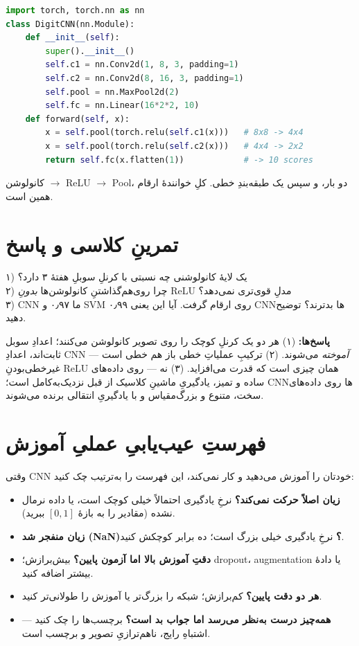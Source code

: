 \documentclass[12pt,a4paper]{article}
\begin{document}
\begin{ltrcode}
\begin{lstlisting}[language=Python]
import torch, torch.nn as nn
class DigitCNN(nn.Module):
    def __init__(self):
        super().__init__()
        self.c1 = nn.Conv2d(1, 8, 3, padding=1)
        self.c2 = nn.Conv2d(8, 16, 3, padding=1)
        self.pool = nn.MaxPool2d(2)
        self.fc = nn.Linear(16*2*2, 10)
    def forward(self, x):
        x = self.pool(torch.relu(self.c1(x)))   # 8x8 -> 4x4
        x = self.pool(torch.relu(self.c2(x)))   # 4x4 -> 2x2
        return self.fc(x.flatten(1))            # -> 10 scores
\end{lstlisting}
\end{ltrcode}

کانولوشن $\rightarrow$ ReLU $\rightarrow$ Pool، دو بار، و سپس یک طبقه‌بندِ خطی. کلِ خوانندهٔ ارقام همین است.

\section{تمرینِ کلاسی و پاسخ}

\begin{tamrin}
۱) یک لایهٔ کانولوشنی چه نسبتی با کرنلِ سوبلِ هفتهٔ ۳ دارد؟\\
۲) چرا روی‌هم‌گذاشتنِ کانولوشن‌ها \emph{بدونِ} ReLU مدلِ قوی‌تری نمی‌دهد؟\\
۳) CNNِ ما ۰٫۹۷ و SVM ۰٫۹۹ روی ارقام گرفت. آیا این یعنی CNNها بدترند؟ توضیح دهید.
\end{tamrin}

\textbf{پاسخ‌ها:} (۱) هر دو یک کرنلِ کوچک را روی تصویر کانولوشن می‌کنند؛ اعدادِ سوبل ثابت‌اند، اعدادِ CNN \emph{آموخته} می‌شوند. (۲) ترکیبِ عملیاتِ خطی باز هم خطی است — غیرخطی‌بودنِ ReLU همان چیزی است که قدرت می‌افزاید. (۳) نه — روی داده‌های ساده و تمیز، یادگیریِ ماشینِ کلاسیک از قبل نزدیک‌به‌کامل است؛ CNNها روی داده‌های سخت، متنوع و بزرگ‌مقیاس و با یادگیریِ انتقالی برنده می‌شوند.

\section{فهرستِ عیب‌یابیِ عملیِ آموزش}

وقتی CNNِ خودتان را آموزش می‌دهید و کار نمی‌کند، این فهرست را به‌ترتیب چک کنید:

\begin{itemize}
  \item \textbf{زیان اصلاً حرکت نمی‌کند؟} نرخِ یادگیری احتمالاً خیلی کوچک است، یا داده نرمال نشده (مقادیر را به بازهٔ $[0,1]$ ببرید).
  \item \textbf{زیان منفجر شد (NaN)؟} نرخِ یادگیری خیلی بزرگ است؛ ده برابر کوچکش کنید.
  \item \textbf{دقتِ آموزش بالا اما آزمون پایین؟} بیش‌برازش؛ dropout، augmentation یا دادهٔ بیشتر اضافه کنید.
  \item \textbf{هر دو دقت پایین؟} کم‌برازش؛ شبکه را بزرگ‌تر یا آموزش را طولانی‌تر کنید.
  \item \textbf{همه‌چیز درست به‌نظر می‌رسد اما جواب بد است؟} برچسب‌ها را چک کنید — اشتباهِ رایج، ناهم‌ترازیِ تصویر و برچسب است.
\end{itemize}
\end{document}
